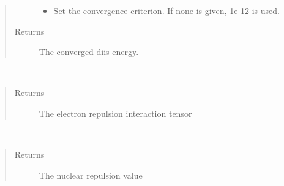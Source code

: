 \documentclass[letterpaper,10pt,english]{sphinxmanual}
\begin{document}
\begin{fulllineitems}
\begin{fulllineitems}
\begin{quote}
\begin{description}
\begin{itemize}
\item {} 
 \textendash{} Set the convergence criterion. If none is given, 1e-12 is used.

\end{itemize}

\item[{Returns}] \leavevmode
The converged diis energy.

\end{description}\end{quote}

\end{fulllineitems}


\begin{fulllineitems}
\label{\detokenize{cUHF_b:hf.HartreeFock.cUHF_b.MF.get_two_e}}~\begin{quote}\begin{description}
\item[{Returns}] \leavevmode
The electron repulsion interaction tensor

\end{description}\end{quote}

\end{fulllineitems}


\begin{fulllineitems}
\label{\detokenize{cUHF_b:hf.HartreeFock.cUHF_b.MF.nuc_rep}}~\begin{quote}\begin{description}
\item[{Returns}] \leavevmode
The nuclear repulsion value

\end{description}\end{quote}

\end{fulllineitems}



\end{fulllineitems}
\end{document}

